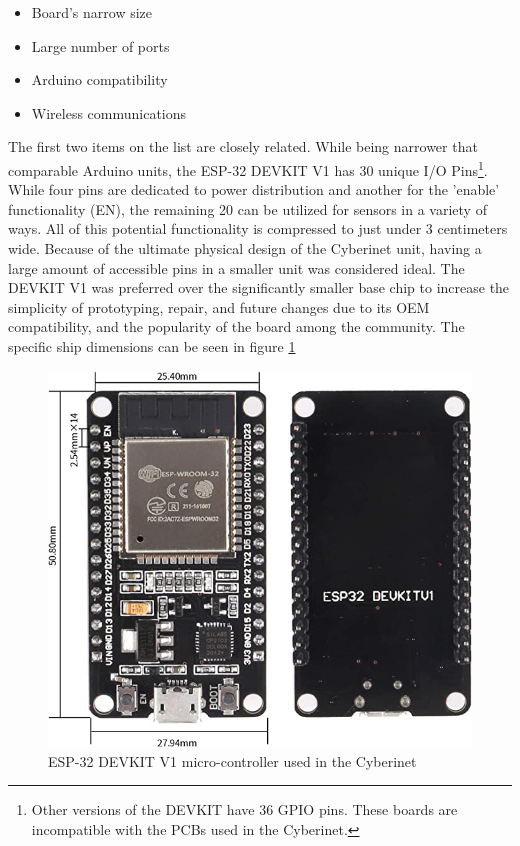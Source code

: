 \begin{itemize}
    \item Board's narrow size
    \item Large number of ports
    \item Arduino compatibility
    \item Wireless communications
\end{itemize}

The first two items on the list are closely related. While being narrower that comparable Arduino units, the ESP-32 DEVKIT V1 has 30 unique I/O Pins\footnote{Other versions of the DEVKIT have 36 GPIO pins. These boards are incompatible with the PCBs used in the Cyberinet.}. While four pins are dedicated to power distribution and another for the 'enable' functionality (EN), the remaining 20 can be utilized for sensors in a variety of ways. All of this potential functionality is compressed to just under 3 centimeters wide. Because of the ultimate physical design of the Cyberinet unit, having a large amount of accessible pins in a smaller unit was considered ideal. The DEVKIT V1 was preferred over the significantly smaller base chip to increase the simplicity of prototyping, repair, and future changes due to its OEM compatibility, and the popularity of the board among the community. The specific ship dimensions can be seen in figure \ref{fig:esp-32}

\begin{center}
    \begin{figure}
        \centering
        \includegraphics[scale=0.5]{diagrams/oem/esp-32.jpg}
        \caption{ESP-32 DEVKIT V1 micro-controller used in the Cyberinet}
        \label{fig:esp-32}
    \end{figure}
\end{center}

